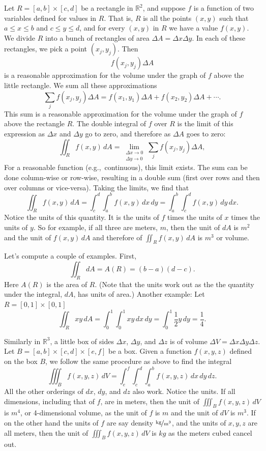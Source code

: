 \documentclass[12pt]{article}
\newcommand{\R}{{\mathbb{R}}}
\begin{document}
Let $R = [a,b] \times [c,d]$ be a rectangle in $\R^2$, and suppose
$f$ is a function of two variables defined for values in $R$.
That is, $R$ is all the points
$(x,y)$ such that $a \leq x \leq b$ and $c \leq y \leq d$,
and for every $(x,y)$ in $R$ we have a value $f(x,y)$.
We divide $R$ into a bunch of rectangles of area $\Delta A = \Delta x \Delta y$.
In each of these rectangles, we pick a point $(x_j,y_j)$.  Then
\[
f(x_j,y_j) \Delta A
\]
is a reasonable approximation for the volume under the graph of $f$ above the little
rectangle.
We sum all these approximations
\[
\sum_j 
f(x_j,y_j) \Delta A 
=
f(x_1,y_1) \Delta A
+
f(x_2,y_2) \Delta A
+
\cdots .
\]
This sum is
a reasonable approximation for the volume under the graph of $f$ above the rectangle
$R$.
The double integral of $f$ over $R$ is the limit of
this expression
as $\Delta x$ and $\Delta y$ go to zero,
and therefore as $\Delta A$ goes to zero:
\[
\iint_R f(x,y) \, dA =
\lim_{\substack{\Delta x \to 0 \\ \Delta y \to 0}}
\sum_j 
f(x_j,y_j) \Delta A ,
\]
For a reasonable function (e.g.,\ continuous), this limit exists.
The sum can be done column-wise or row-wise, resulting in a
double sum (first over rows and then over columns or vice-versa).
Taking the limits, we find that
\[
\iint_R f(x,y) \, dA
=
\int_c^d \int_a^b f(x,y) \, dx \, dy
=
\int_a^b \int_c^d f(x,y) \, dy \, dx .
\]
Notice the units of this quantity.  It is the units of $f$ times the units of $x$ times
the units of $y$.  So for example, if all three are meters, $\unit{m}$,
then the unit of $dA$ is $\unit{m^2}$ and
the unit of
$f(x,y) \, dA$
and therefore of
$\iint_R f(x,y) \, dA$
is $\unit{m^3}$ or volume.

Let's compute a couple of examples.
First,
\[
\iint_R dA = A(R) = (b-a)(d-c) .
\]
Here $A(R)$ is the area of $R$.
(Note that the units work out as the 
the quantity under the integral, $dA$, has units of area.)
Another example:  Let $R = [0,1] \times [0,1]$
\[
\iint_R xy\, dA =
\int_0^1 \int_0^1 xy \, dx \, dy
=
\int_0^1 \frac{1}{2} y \, dy
= \frac{1}{4}.
\]

Similarly in $\R^3$, a little box of sides $\Delta x$, $\Delta y$, and $\Delta z$
is of volume $\Delta V = \Delta x \Delta y \Delta z$.  
Let $B = [a,b] \times [c,d] \times [e,f]$ be a box.
Given a function $f(x,y,z)$
defined on the box $B$, we follow
the same procedure as above to find the integral
\[
\iiint_B f(x,y,z) \, dV
=
\int_e^f \int_c^d \int_a^b f(x,y,z) \, dx \, dy \, dz .
\]
All the other orderings of $dx$, $dy$, and $dz$ also work.
Notice the units.  If all dimensions, including that of $f$, are in meters, then
the unit of
$\iiint_B f(x,y,z) \, dV$ is $\unit{m^4}$, or 4-dimensional volume,
as the unit of $f$ is $\unit{m}$ and the unit of $dV$ is $\unit{m^3}$.
If on the other hand the units of $f$ are say density $\unitfrac{kg}{m^3}$,
and the units of $x,y,z$ are all meters,
then the unit of
$\iiint_B f(x,y,z) \, dV$ is $\unit{kg}$ as the meters cubed cancel out.
\end{document}
